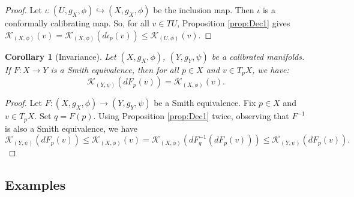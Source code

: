 \documentclass[11pt]{article}
\newtheorem{cor}[thm]{Corollary}
\theoremstyle{definition}
\numberwithin{equation}{section}
\begin{document}
\begin{proof} Let $\iota \colon (U, g_X, \phi) \hookrightarrow (X, g_X, \phi)$ be the inclusion map.  Then $\iota$ is a conformally calibrating map.  So, for all $v \in TU$, Proposition \ref{prop:Dec1} gives $ \mathcal{K}_{(X, \phi)}(v) =  \mathcal{K}_{(X, \phi)}( d\iota_p(v) ) \leq \mathcal{K}_{(U, \phi)}(v)$.
\end{proof}

\begin{cor}[Invariance] \label{cor:Invariance} Let $(X, g_X, \phi)$, $(Y, g_Y, \psi)$ be a calibrated manifolds.  If $F \colon X \to Y$ is a Smith equivalence, then for all $p \in X$ and $v \in T_pX$, we have:
$$\mathcal{K}_{(Y,\psi)}(dF_p(v)) = \mathcal{K}_{(X,\phi)}(v).$$
\end{cor}

\begin{proof} Let $F \colon (X, g_X, \phi) \to (Y, g_Y, \psi)$ be a Smith equivalence.  Fix $p \in X$ and $v \in T_pX$.  Set $q = F(p)$.  Using Proposition \ref{prop:Dec1} twice, observing that $F^{-1}$ is also a Smith equivalence, we have
$$\mathcal{K}_{(Y,\psi)}(dF_p(v)) \leq \mathcal{K}_{(X,\phi)}(v) = \mathcal{K}_{(X,\phi)}( dF^{-1}_q (dF_p(v) ) ) \leq \mathcal{K}_{(Y,\psi)}( dF_p(v)).$$
\end{proof}

\subsection{Examples} \label{sub:Examples-KR}
\end{document}
